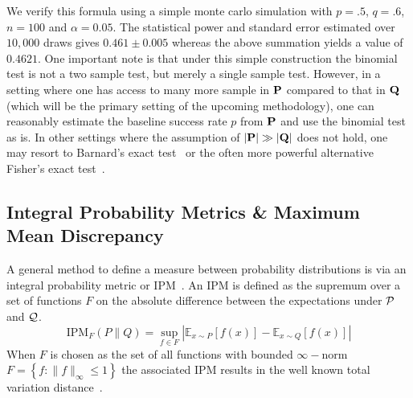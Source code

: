 We verify this formula using a simple monte carlo simulation with $p=.5$, $q=.6$, $n=100$ and $\alpha=0.05$.
The statistical power and standard error estimated over $10,000$ draws gives $0.461\pm 0.005$ whereas the above summation yields a value of $0.4621$.
One important note is that under this simple construction the binomial test is not a two sample test, but merely a single sample test.
However, in a setting where one has access to many more sample in $\mathbf{P}$ compared to that in $\mathbf{Q}$
(which will be the primary setting of the upcoming methodology), one can reasonably estimate the baseline success rate $p$ from $\mathbf{P}$ and use the binomial test as is.
In other settings where the assumption of $|\mathbf{P}|\gg|\mathbf{Q}|$ does not hold, one may resort to Barnard's exact test~\citep{Barnardp88:online} or the often more powerful alternative Fisher's exact test~\citep{fisher_r_a_1922_1449484}.

\subsection*{Integral Probability Metrics \& Maximum Mean Discrepancy}
A general method to define a measure between probability distributions is via an integral probability metric or IPM~\citep{IPMS}.
An IPM is defined as the supremum over a set of functions $F$ on the absolute difference between the expectations under $\mathcal{P}$ and $\mathcal{Q}$.
\begin{equation*}
    \text{IPM}_F(P \| Q)=\sup_{f\in F}|\mathbb{E}_{x\sim P}\left[ f(x)\right] - \mathbb{E}_{x\sim Q}\left[ f(x)\right]|
\end{equation*}
When $F$ is chosen as the set of all functions with bounded $\infty-$norm $F = \left\{f:\|f\|_{\infty} \leq 1\right\}$
the associated IPM results in the well known total variation distance~\citep{ipm-divergences}.

